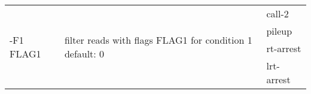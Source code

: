 {\small
\begin{tabular}{@{}p{}p{}l@{}}
\multirow{4}{=}{-F1 FLAG1} & \multirow{4}{=}{filter reads with flags FLAG1 for condition 1
default: 0} & call-2 \\
 &  & pileup \\
 &  & rt-arrest \\
 &  & lrt-arrest \\
\end{tabular}\\
}
